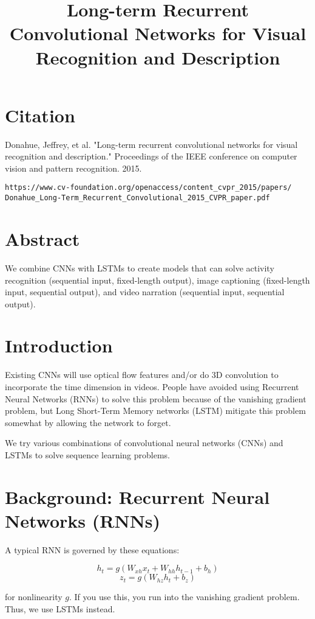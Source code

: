 \documentclass[a4paper]{article}
\title{Long-term Recurrent Convolutional Networks for
Visual Recognition and Description}
\date{}
\begin{document}
\maketitle

\section{Citation}
Donahue, Jeffrey, et al. "Long-term recurrent convolutional networks for visual recognition and description." Proceedings of the IEEE conference on computer vision and pattern recognition. 2015.

\begin{verbatim}
https://www.cv-foundation.org/openaccess/content_cvpr_2015/papers/
Donahue_Long-Term_Recurrent_Convolutional_2015_CVPR_paper.pdf
\end{verbatim}

\section{Abstract}
We combine CNNs with LSTMs to create models that can solve activity recognition
(sequential input, fixed-length output), image captioning (fixed-length input,
sequential output), and video narration (sequential input, sequential output).

\section{Introduction}
Existing CNNs will use optical flow features and/or do 3D convolution to
incorporate the time dimension in videos. People have avoided using Recurrent
Neural Networks (RNNs) to solve this problem because of the vanishing gradient
problem, but Long Short-Term Memory networks (LSTM) mitigate this problem
somewhat by allowing the network to forget.

We try various combinations of convolutional neural networks (CNNs) and LSTMs
to solve sequence learning problems.

\section{Background: Recurrent Neural Networks (RNNs)}
A typical RNN is governed by these equations:

$$
h_t = g(W_{xh} x_t + W_{hh} h_{t-1} + b_h)
$$
$$
z_t = g(W_{hz} h_t + b_z)
$$

for nonlinearity $g$. If you use this, you run into the vanishing gradient
problem. Thus, we use LSTMs instead.
\end{document}
